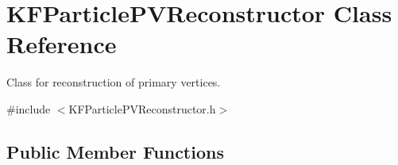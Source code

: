 \hypertarget{classKFParticlePVReconstructor}{}\section{K\+F\+Particle\+P\+V\+Reconstructor Class Reference}
\label{classKFParticlePVReconstructor}


Class for reconstruction of primary vertices.  




{\ttfamily \#include $<$K\+F\+Particle\+P\+V\+Reconstructor.\+h$>$}

\subsection*{Public Member Functions}
